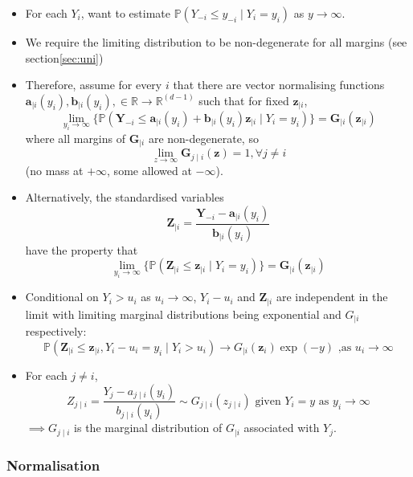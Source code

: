 \documentclass{article}
\numberwithin{equation}{section}
\begin{document}
\begin{itemize}
  \item For each $Y_i$, want to estimate $\mathbb{P}(Y_{-i} \le y_{-i} \mid Y_i = y_i)$ as $y \rightarrow \infty$. 
  \item We require the limiting distribution to be non-degenerate for all margins (see section\ref{sec:uni})
  \item Therefore, assume for every $i$ that there are vector normalising functions $\bm{a}_{\mid i}(y_i),\bm{b}_{\mid i}(y_i), \in \mathbb{R} \rightarrow \mathbb{R}^{(d-1)}$ such that for fixed $\bm{z}_{\mid i}$, 
    \[
      \lim_{y_i \rightarrow \infty}\{\mathbb{P}(\bm{Y}_{-i} \le \bm{a}_{\mid i}(y_i) + \bm{b}_{\mid i}(y_i)\bm{z}_{\mid i} \mid Y_i = y_i)\} = \bm{G}_{\mid i}(\bm{z}_{\mid i})
    \] 
    where all margins of $\bm{G}_{\mid i}$ are non-degenerate, so 
    \[
    \lim_{z \rightarrow \infty}{\bm{G}_{j \mid i}(\bm{z})} = 1, \forall j \ne i
    \] (no mass at $+\infty$, some allowed at $-\infty$).
  \item Alternatively, the standardised variables
    \[
      \bm{Z}_{\mid i} = \frac{\bm{Y}_{-i} - \bm{a}_{\mid i}(y_i)} {\bm{b}_{\mid i}(y_i)}
    \]
    have the property that 
    \[
      \lim_{y_i \rightarrow \infty}\{\mathbb{P}(\bm{Z}_{\mid i} \le \bm{z}_{\mid i} \mid Y_i = y_i)\} = \bm{G}_{\mid i}(\bm{z}_{\mid i})
    \]
  \item Conditional on $Y_i > u_i$ as $u_i \rightarrow \infty$, $Y_i  - u_i$ and $\bm{Z}_{\mid i}$ are independent in the limit with limiting marginal distributions being exponential and $G_{\mid i}$ respectively:
    \[
      \mathbb{P}(\bm{Z}_{\mid i} \le \bm{z}_{\mid i}, Y_i - u_i = y_i \mid Y_i > u_i) \rightarrow G_{\mid i}(\bm{z}_i) \exp(-y) \text{ ,as } u_i \rightarrow \infty
    \]
  \item For each $j \ne i$, 
    \[
      Z_{j\mid i} = \frac{Y_j - a_{j\mid i}(y_i)}{b_{j\mid i}(y_i)} \sim G_{j\mid i}(z_{j\mid i}) \text { given } Y_i = y \text{ as } y_i \rightarrow \infty
    \]
    $\implies G_{j \mid i}$ is the marginal distribution of $G_{\mid i}$ associated with $Y_j$.
\end{itemize}

\subsubsection{Normalisation} \label{subsubsec:norm}
\end{document}
